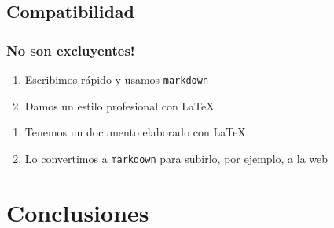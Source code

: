 \documentclass[svgnames]{beamer}
\begin{document}
\subsection{Compatibilidad}

\begin{frame}
  \frametitle{No son excluyentes!}
  \begin{enumerate}
    \item Escribimos rápido y usamos \texttt{markdown}
    \item Damos un estilo profesional con \LaTeX
  \end{enumerate}\pause
  \begin{enumerate}
    \item Tenemos un documento elaborado con \LaTeX
    \item Lo convertimos a \texttt{markdown} para subirlo, por ejemplo, a la web
  \end{enumerate}\pause
\end{frame}

\section{Conclusiones}
\end{document}
